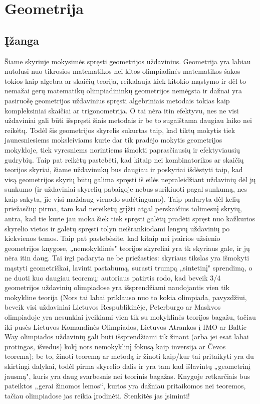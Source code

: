 \chapter{Geometrija}
\def\asydir{./iliustracijos/geometrija}

\thispagestyle{empty}
\section{Įžanga}

Šiame skyriuje mokysimės spręsti geometrijos uždavinius. Geometrija yra
labiau nutolusi nuo tikrosios matematikos nei kitos olimpiadinės
matematikos šakos tokios kaip algebra ar skaičių teorija, reikalauja kiek
kitokio mąstymo ir dėl to nemažai gerų matematikų olimpiadininkų
geometrijos nemėgsta ir dažnai yra pasiruošę geometrijos uždavinius spręsti
algebriniais metodais tokias kaip kompleksiniai skaičiai ar trigonometrija.
O tai nėra itin efektyvu, nes ne visi uždaviniai gali būti išspręsti šiais
metodais ir be to sugaištama daugiau laiko nei reikėtų. Todėl šis
geometrijos skyrelis sukurtas taip, kad tiktų mokytis tiek jaunesniesiems
moksleiviams kurie dar tik pradėjo mokytis geometrijos mokykloje, tiek
vyresniems norintiems išmokti paprasčiausių ir efektyviausių gudrybių. Taip
pat reikėtų pastebėti, kad kitaip nei kombinatorikos ar skaičių teorijos
skyriai, šiame  uždavinukų bus daugiau ir poskyriai išdėstyti taip, kad
visą geometrijos skyrių būtų galima spręsti iš eilės nepraleidžiant
uždavinių dėl jų sunkumo (ir uždaviniai skyrelių pabaigoje nebus surikiuoti
pagal sunkumą, nes kaip sakyta, jie visi maždaug vienodo sudėtingumo). Taip
padaryta dėl kelių priežasčių: pirma, tam kad nereikėtų grįžti atgal
perskaičius tolimesnį skryių, antra, kad tie kurie jau moka šiek tiek
spręsti galėtų pradėti spręst nuo kažkurios skyrelio vietos ir galėtų
spręsti tolyn neišrankiodami lengvų uždavinių po kiekvienos temos. Taip pat
pastebėsite, kad kitaip nei įvairios užsienio geometrijos knygose,
„nemokyklinės" teorijos skyreliai yra tk skyriaus gale, ir jų  nėra itin
daug. Tai irgi padaryta ne be priežasties: skyriaus  tikslas yra išmokyti
mąstyti geometriškai, lavinti pastabumą, surasti trumpą „sintetinį"
sprendimą, o ne duoti kuo daugiau teoremų: autoriaus patirtis rodo, kad
beveik 3/4 geometrijos uždavinių olimpiadose yra išsprendžiami naudojantis
vien tik mokykline teorija (Nors tai labai priklauso nuo to kokia
olimpiada, pavyzdžiui, beveik visi uždaviniai Lietuvos Respublikinėje,
Peterburgo ar Maskvos olimpiadoje yra nesunkiai įveikiami vien tik su
mokyklinės teorijos bagažu, tačiau iki pusės Lietuvos Komandinės
Olimpiados, Lietuvos Atrankos į IMO ar Baltic Way olimpiados uždavinių gali
būti išsprendžiami tik žinant (arba jei esat labai protingas, išvedus) kokį
nors nemokyklinį fokusą kaip inversija ar Čevos teorema); be to, žinoti
teoremą ar metodą ir žinoti kaip/kur tai pritaikyti yra du skirtingi
dalykai, todėl pirma skyrelio dalis ir yra tam kad išlavintų „geometrinį
jausmą", kuris yra daug svarbesnis nei teorinis bagažas.  Knygoje
retkarčiais bus pateiktos „gerai žinomos lemos“, kurios yra dažniau
pritaikomos nei teoremos, tačiau olimpiadose jas reikia įrodinėti.
Stenkitės jas įsiminti!

